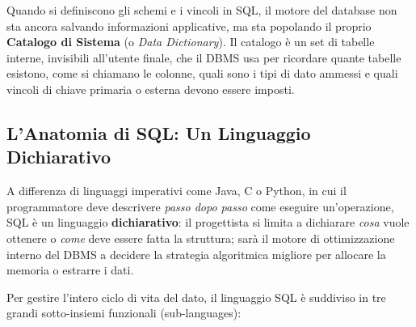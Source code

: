 Quando si definiscono gli schemi e i vincoli in SQL, il motore del database non sta ancora salvando informazioni applicative, ma sta popolando il proprio \textbf{Catalogo di Sistema} (o \textit{Data Dictionary}). Il catalogo è un set di tabelle interne, invisibili all'utente finale, che il DBMS usa per ricordare quante tabelle esistono, come si chiamano le colonne, quali sono i tipi di dato ammessi e quali vincoli di chiave primaria o esterna devono essere imposti.

\subsection*{L'Anatomia di SQL: Un Linguaggio Dichiarativo}

A differenza di linguaggi imperativi come Java, C o Python, in cui il programmatore deve descrivere \textit{passo dopo passo} come eseguire un'operazione, SQL è un linguaggio \textbf{dichiarativo}: il progettista si limita a dichiarare \textit{cosa} vuole ottenere o \textit{come} deve essere fatta la struttura; sarà il motore di ottimizzazione interno del DBMS a decidere la strategia algoritmica migliore per allocare la memoria o estrarre i dati.

Per gestire l'intero ciclo di vita del dato, il linguaggio SQL è suddiviso in tre grandi sotto-insiemi funzionali (sub-languages):


